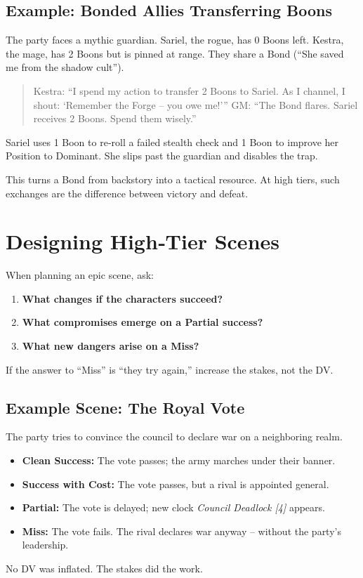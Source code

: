 \subsection*{Example: Bonded Allies Transferring Boons}
The party faces a mythic guardian. Sariel, the rogue, has 0 Boons left. Kestra, the mage, has 2 Boons but is pinned at range. They share a Bond (“She saved me from the shadow cult”).

\begin{quote}
  Kestra: “I spend my action to transfer 2 Boons to Sariel. As I channel, I shout: ‘Remember the Forge – you owe me!’”
  GM: “The Bond flares. Sariel receives 2 Boons. Spend them wisely.”
\end{quote}
Sariel uses 1 Boon to re‑roll a failed stealth check and 1 Boon to improve her Position to Dominant. She slips past the guardian and disables the trap.

This turns a Bond from backstory into a tactical resource. At high tiers, such exchanges are the difference between victory and defeat.

\section{Designing High‑Tier Scenes}

When planning an epic scene, ask:
\begin{enumerate}
  \item \textbf{What changes if the characters succeed?}
  \item \textbf{What compromises emerge on a Partial success?}
  \item \textbf{What new dangers arise on a Miss?}
\end{enumerate}

If the answer to “Miss” is “they try again,” increase the stakes, not the DV.

\subsection*{Example Scene: The Royal Vote}
The party tries to convince the council to declare war on a neighboring realm.
\begin{itemize}
  \item \textbf{Clean Success:} The vote passes; the army marches under their banner.
  \item \textbf{Success with Cost:} The vote passes, but a rival is appointed general.
  \item \textbf{Partial:} The vote is delayed; new clock \emph{Council Deadlock [4]} appears.
  \item \textbf{Miss:} The vote fails. The rival declares war anyway – without the party’s leadership.
\end{itemize}
No DV was inflated. The stakes did the work.

